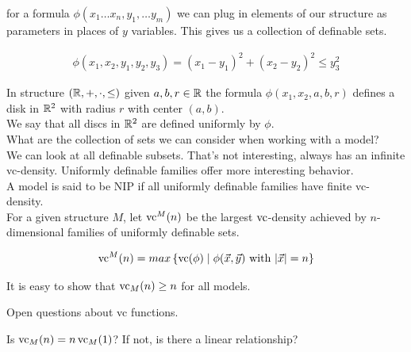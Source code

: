 \documentclass{amsart}
\newcommand{\curly}[1]{\left\{ #1 \right\}}
\begin{document}
\begin{Definition}
	for a formula $\phi(x_1 \ldots x_n, y_1, \ldots y_m)$ we can plug in elements of our structure as parameters in places of $y$ variables. This gives us a collection of definable sets. 
\end{Definition}

\begin{Example}
	\begin{align*}
		\phi(x_1, x_2, y_1, y_2, y_3) = (x_1 - y_1)^2 + (x_2 - y_2)^2 \leq y_3^2
	\end{align*}
\end{Example}

In structure $(\mathbb{R}, +, \cdot, \leq)$ given $a,b,r \in \mathbb{R}$ the formula $\phi(x_1, x_2, a, b, r)$ defines a disk in $\mathbb{R}^2$ with radius $r$ with center $(a,b)$. \\

We say that all discs in $\mathbb{R}^2$ are defined uniformly by $\phi$. \\

What are the collection of sets we can consider when working with a model? \\

We can look at all definable subsets. That's not interesting, always has an infinite vc-density.
Uniformly definable families offer more interesting behavior. \\

A model is said to be NIP if all uniformly definable families have finite vc-density. \\

For a given structure $M$, let $\operatorname{vc}^M(n)$ be the largest $\operatorname{vc}$-density achieved by $n$-dimensional families of uniformly definable sets.

\begin{align*}
	\vc^M(n) = max \curly{ \vc(\phi) \mid \phi(\vec x, \vec y) \text{ with } |\vec x| = n}
\end{align*}

It is easy to show that $\operatorname{vc}_M(n) \geq n$ for all models.

Open questions about vc functions.

Is $\operatorname{vc}_M(n) = n \operatorname{vc}_M(1)$? If not, is there a linear relationship?
\end{document}
